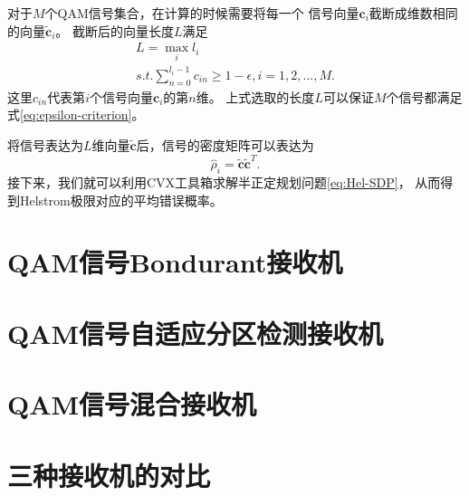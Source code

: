 对于$M$个QAM信号集合，在计算的时候需要将每一个
信号向量$\bm{c}_i$截断成维数相同的向量$\tilde{\bm{c}}_i$。
截断后的向量长度$L$满足
\begin{equation}
\begin{split}
L = \max_i l_i  \\
s.t. \sum_{n=0}^{l_i-1} c_{in} \ge 1 - \epsilon, i=1,2,...,M.
\end{split}
\end{equation}
这里$c_{in}$代表第$i$个信号向量$\bm{c}_i$的第$n$维。
上式选取的长度$L$可以保证$M$个信号都满足式\ref{eq:epsilon-criterion}。

将信号表达为$L$维向量$\tilde{\bm{c}}$后，信号的密度矩阵可以表达为
\begin{equation}
\hat{\rho}_i = \tilde{\bm{c}} \tilde{\bm{c}}^T.
\end{equation}
接下来，我们就可以利用CVX工具箱求解半正定规划问题\ref{eq:Hel-SDP}，
从而得到Helstrom极限对应的平均错误概率。





\section{QAM信号Bondurant接收机}


\section{QAM信号自适应分区检测接收机}


\section{QAM信号混合接收机}


\section{三种接收机的对比}

